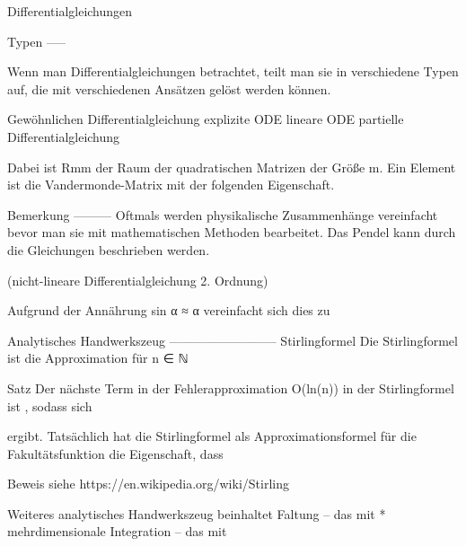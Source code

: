 Differentialgleichungen

Typen
-----

Wenn man Differentialgleichungen betrachtet, teilt man sie in verschiedene Typen auf, die mit verschiedenen Ansätzen gelöst werden können.

Gewöhnlichen Differentialgleichung
explizite ODE
lineare ODE
partielle Differentialgleichung

Dabei ist Rmm der Raum der quadratischen Matrizen der Größe m. Ein Element ist die Vandermonde-Matrix mit der folgenden Eigenschaft.


Bemerkung
---------
Oftmals werden physikalische Zusammenhänge vereinfacht bevor man sie mit mathematischen Methoden bearbeitet. Das Pendel kann durch die Gleichungen beschrieben werden.


(nicht-lineare Differentialgleichung 2. Ordnung)

Aufgrund der Annährung sin α ≈ α vereinfacht sich dies zu

Analytisches Handwerkszeug
--------------------------
Stirlingformel
Die Stirlingformel ist die Approximation für n ∈ ℕ

Satz
Der nächste Term in der Fehlerapproximation O(ln(n)) in der Stirlingformel ist , sodass sich 

ergibt. Tatsächlich hat die Stirlingformel als Approximationsformel für die Fakultätsfunktion die Eigenschaft, dass

Beweis siehe https://en.wikipedia.org/wiki/Stirling%

Weiteres analytisches Handwerkszeug beinhaltet
Faltung -- das mit *
mehrdimensionale Integration -- das mit
